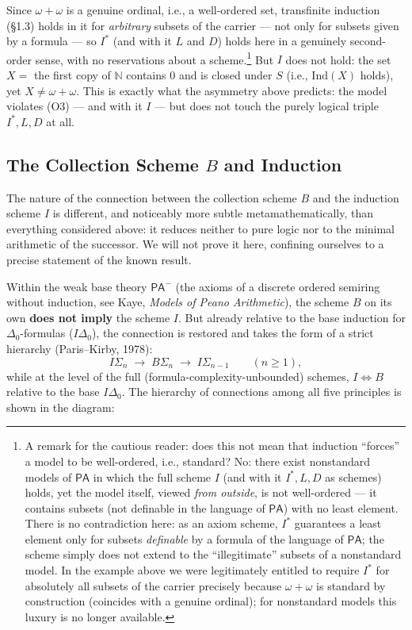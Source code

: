 \documentclass[12pt,a4paper]{article}
\theoremstyle{plain}
\theoremstyle{definition}
\newcommand{\toinf}{\rightarrow}
\newcommand{\PA}{\textsf{PA}}
\begin{document}
Since $\omega+\omega$ is a genuine ordinal, i.e., a well-ordered set, transfinite induction (§1.3) holds in it for \emph{arbitrary} subsets of the carrier --- not only for subsets given by a formula --- so $I^*$ (and with it $L$ and $D$) holds here in a genuinely second-order sense, with no reservations about a scheme.\footnote{A remark for the cautious reader: does this not mean that induction ``forces'' a model to be well-ordered, i.e., standard? No: there exist nonstandard models of $\PA$ in which the full scheme $I$ (and with it $I^*,L,D$ as schemes) holds, yet the model itself, viewed \emph{from outside}, is not well-ordered --- it contains subsets (not definable in the language of $\PA$) with no least element. There is no contradiction here: as an axiom scheme, $I^*$ guarantees a least element only for subsets \emph{definable} by a formula of the language of $\PA$; the scheme simply does not extend to the ``illegitimate'' subsets of a nonstandard model. In the example above we were legitimately entitled to require $I^*$ for absolutely all subsets of the carrier precisely because $\omega+\omega$ is standard by construction (coincides with a genuine ordinal); for nonstandard models this luxury is no longer available.} But $I$ does not hold: the set $X=$ the first copy of $\mathbb N$ contains $0$ and is closed under $S$ (i.e., $\mathrm{Ind}(X)$ holds), yet $X\ne\omega+\omega$. This is exactly what the asymmetry above predicts: the model violates (O3) --- and with it $I$ --- but does not touch the purely logical triple $I^*, L, D$ at all.

\subsection{The Collection Scheme $B$ and Induction}
The nature of the connection between the collection scheme $B$ and the induction scheme $I$ is different, and noticeably more subtle metamathematically, than everything considered above: it reduces neither to pure logic nor to the minimal arithmetic of the successor. We will not prove it here, confining ourselves to a precise statement of the known result.

Within the weak base theory $\PA^-$ (the axioms of a discrete ordered semiring without induction, see Kaye, \textit{Models of Peano Arithmetic}), the scheme $B$ on its own \textbf{does not imply} the scheme $I$. But already relative to the base induction for $\Delta_0$-formulas ($I\Delta_0$), the connection is restored and takes the form of a strict hierarchy (Paris--Kirby, 1978):
$$I\Sigma_n \;\toinf\; B\Sigma_n \;\toinf\; I\Sigma_{n-1} \qquad (n\ge1),$$
while at the level of the full (formula-complexity-unbounded) schemes, $I \iff B$ relative to the base $I\Delta_0$. The hierarchy of connections among all five principles is shown in the diagram:
\end{document}
